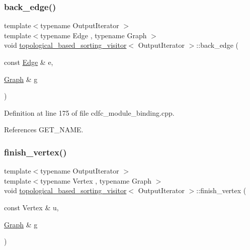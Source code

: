 \subsubsection{\texorpdfstring{back\+\_\+edge()}{back\_edge()}}
{\footnotesize\ttfamily template$<$typename Output\+Iterator $>$ \\
template$<$typename Edge , typename Graph $>$ \\
void \hyperlink{structtopological__based__sorting__visitor}{topological\+\_\+based\+\_\+sorting\+\_\+visitor}$<$ Output\+Iterator $>$\+::back\+\_\+edge (\begin{DoxyParamCaption}\item[{const \hyperlink{structEdge}{Edge} \&}]{e,  }\item[{\hyperlink{structGraph}{Graph} \&}]{g }\end{DoxyParamCaption})\hspace{0.3cm}{\ttfamily [inline]}}



Definition at line 175 of file cdfc\+\_\+module\+\_\+binding.\+cpp.



References G\+E\+T\+\_\+\+N\+A\+ME.

\mbox{\label{structtopological__based__sorting__visitor_ae5d12d2402e172f3a6a9d8ebfd279739}} 
\subsubsection{\texorpdfstring{finish\+\_\+vertex()}{finish\_vertex()}}
{\footnotesize\ttfamily template$<$typename Output\+Iterator $>$ \\
template$<$typename Vertex , typename Graph $>$ \\
void \hyperlink{structtopological__based__sorting__visitor}{topological\+\_\+based\+\_\+sorting\+\_\+visitor}$<$ Output\+Iterator $>$\+::finish\+\_\+vertex (\begin{DoxyParamCaption}\item[{const Vertex \&}]{u,  }\item[{\hyperlink{structGraph}{Graph} \&}]{g }\end{DoxyParamCaption})\hspace{0.3cm}{\ttfamily [inline]}}



